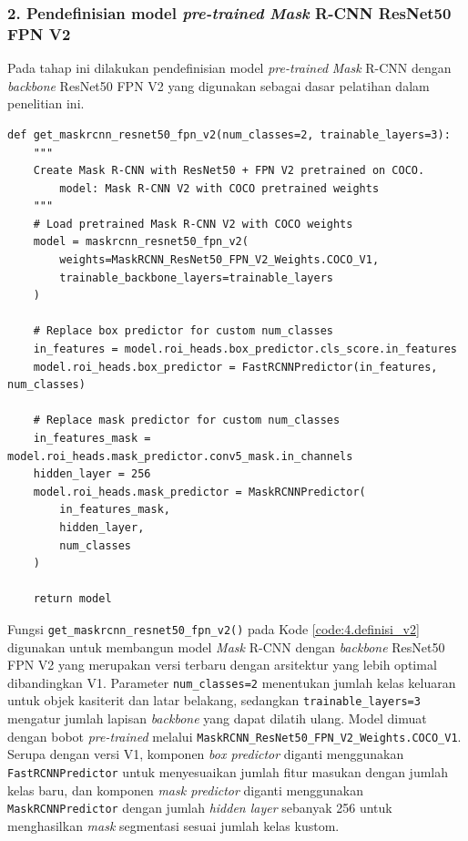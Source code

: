\subsubsection*{\textnormal{2. Pendefinisian model \textit{pre-trained} \textit{Mask} R-CNN ResNet50 FPN V2}}
Pada tahap ini dilakukan pendefinisian model \textit{pre-trained} \textit{Mask} R-CNN dengan \textit{backbone} ResNet50 FPN V2 yang digunakan sebagai dasar pelatihan dalam penelitian ini.

\begin{lstlisting}[caption={Pendefinisian Model \textit{pre-trained} \textit{Mask} R-CNN ResNet50 FPN V2}, label={code:4.definisi_v2}]
def get_maskrcnn_resnet50_fpn_v2(num_classes=2, trainable_layers=3):
    """
    Create Mask R-CNN with ResNet50 + FPN V2 pretrained on COCO.
        model: Mask R-CNN V2 with COCO pretrained weights
    """
    # Load pretrained Mask R-CNN V2 with COCO weights
    model = maskrcnn_resnet50_fpn_v2(
        weights=MaskRCNN_ResNet50_FPN_V2_Weights.COCO_V1,
        trainable_backbone_layers=trainable_layers
    )
    
    # Replace box predictor for custom num_classes
    in_features = model.roi_heads.box_predictor.cls_score.in_features
    model.roi_heads.box_predictor = FastRCNNPredictor(in_features, num_classes)
    
    # Replace mask predictor for custom num_classes
    in_features_mask = model.roi_heads.mask_predictor.conv5_mask.in_channels
    hidden_layer = 256
    model.roi_heads.mask_predictor = MaskRCNNPredictor(
        in_features_mask,
        hidden_layer,
        num_classes
    )
    
    return model
\end{lstlisting}

Fungsi \texttt{get\_maskrcnn\_resnet50\_fpn\_v2()} pada Kode \ref{code:4.definisi_v2} digunakan untuk membangun model \textit{Mask} R-CNN dengan \textit{backbone} ResNet50 FPN V2 yang merupakan versi terbaru dengan arsitektur yang lebih optimal dibandingkan V1. Parameter \texttt{num\_classes=2} menentukan jumlah kelas keluaran untuk objek kasiterit dan latar belakang, sedangkan \texttt{trainable\_layers=3} mengatur jumlah lapisan \textit{backbone} yang dapat dilatih ulang. Model dimuat dengan bobot \textit{pre-trained} melalui \texttt{MaskRCNN\_ResNet50\_FPN\_V2\_Weights.COCO\_V1}. Serupa dengan versi V1, komponen \textit{box predictor} diganti menggunakan \texttt{FastRCNNPredictor} untuk menyesuaikan jumlah fitur masukan dengan jumlah kelas baru, dan komponen \textit{mask predictor} diganti menggunakan \texttt{MaskRCNNPredictor} dengan jumlah \textit{hidden layer} sebanyak 256 untuk menghasilkan \textit{mask} segmentasi sesuai jumlah kelas kustom. 


